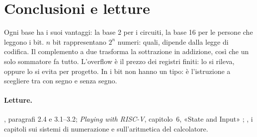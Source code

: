 \section{Conclusioni e letture}

Ogni base ha i suoi vantaggi: la base 2 per i circuiti, la base 16 per le
persone che leggono i bit. $n$ bit rappresentano $2^{n}$ numeri: quali, dipende
dalla legge di codifica. Il complemento a due trasforma la sottrazione in
addizione, così che un solo sommatore fa tutto. L'overflow è il prezzo dei
registri finiti: lo si rileva, oppure lo si evita per progetto. In \riscv i bit
non hanno un tipo: è l'istruzione a scegliere tra con segno e senza segno.

\paragraph{Letture.} \citet{patterson2020}, paragrafi 2.4 e 3.1--3.2;
\emph{Playing with RISC-V}, capitolo~6, «State and Input»
\citep{prg32textbook}; \citet{stallings2021}, i capitoli sui sistemi di
numerazione e sull'aritmetica del calcolatore.